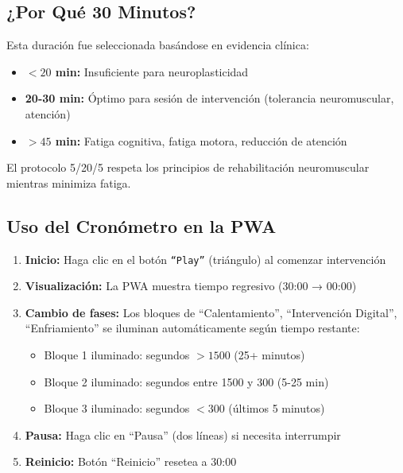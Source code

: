 \documentclass[12pt,a4paper,spanish,oneside]{book}
\begin{document}
\subsection{¿Por Qué 30 Minutos?}

Esta duración fue seleccionada basándose en evidencia clínica:

\begin{conceptobox}
  \begin{itemize}
    \item \textbf{$< 20$ min:} Insuficiente para neuroplasticidad
    \item \textbf{20-30 min:} Óptimo para sesión de intervención (tolerancia neuromuscular, atención)
    \item \textbf{$> 45$ min:} Fatiga cognitiva, fatiga motora, reducción de atención
  \end{itemize}
  
  El protocolo 5/20/5 respeta los principios de rehabilitación neuromuscular mientras minimiza fatiga.
\end{conceptobox}

\subsection{Uso del Cronómetro en la PWA}

\begin{enumerate}
  \item \textbf{Inicio:} Haga clic en el botón \texttt{``Play''} (triángulo) al comenzar intervención
  
  \item \textbf{Visualización:} La PWA muestra tiempo regresivo (30:00 → 00:00)
  
  \item \textbf{Cambio de fases:} Los bloques de ``Calentamiento'', ``Intervención Digital'', ``Enfriamiento'' se iluminan automáticamente según tiempo restante:
  \begin{itemize}
    \item Bloque 1 iluminado: segundos $> 1500$ (25+ minutos)
    \item Bloque 2 iluminado: segundos entre 1500 y 300 (5-25 min)
    \item Bloque 3 iluminado: segundos $< 300$ (últimos 5 minutos)
  \end{itemize}
  
  \item \textbf{Pausa:} Haga clic en ``Pausa'' (dos líneas) si necesita interrumpir
  
  \item \textbf{Reinicio:} Botón ``Reinicio'' resetea a 30:00
\end{enumerate}
\end{document}

